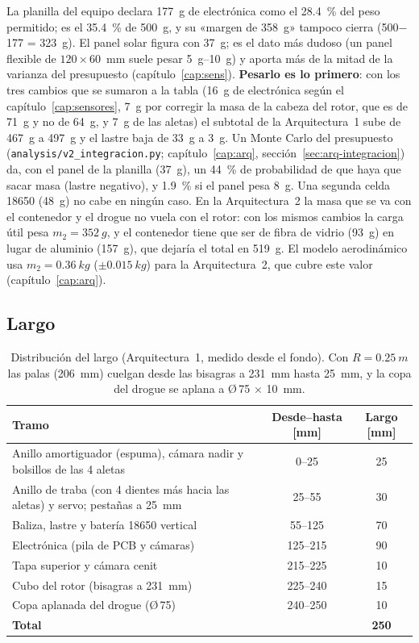 La planilla del equipo declara 177~g de electrónica como el \SI{28.4}{\percent} del peso
permitido; es el \SI{35.4}{\percent} de \SI{500}{g}, y su «margen de 358~g» tampoco cierra
(500$-$177 = 323~g). El panel solar figura con \SI{37}{g}; es el dato más dudoso (un panel
flexible de $120\times60$~mm suele pesar \SIrange{5}{10}{g}) y aporta más de la mitad de la
varianza del presupuesto (capítulo~\ref{cap:sens}). \textbf{Pesarlo es lo primero}: con los
tres cambios que se sumaron a la tabla (\SI{+16}{g} de electrónica según el capítulo~\ref{cap:sensores},
\SI{+7}{g} por corregir la masa de la cabeza del rotor, que es de \SI{71}{g} y no de \SI{64}{g}, y
\SI{+7}{g} de las aletas) el subtotal de la Arquitectura~1 sube de \SI{467}{g} a \SI{497}{g} y el lastre baja de
\SI{33}{g} a \SI{3}{g}. Un Monte Carlo del presupuesto (\texttt{analysis/v2\_integracion.py};
capítulo~\ref{cap:arq}, sección~\ref{sec:arq-integracion}) da, con el panel de la planilla (\SI{37}{g}), un
\SI{44}{\percent} de probabilidad de que haya que sacar masa (lastre negativo), y \SI{1.9}{\percent} si
el panel pesa \SI{8}{g}. Una segunda celda 18650 (\SI{48}{g}) no cabe en ningún caso. En la
Arquitectura~2 la masa que se va con el contenedor y el drogue no vuela con el rotor: con los mismos
cambios la carga útil pesa $m_2=\SI{352}{g}$, y el contenedor tiene que ser de fibra de vidrio
(\SI{93}{g}) en lugar de aluminio (\SI{157}{g}), que dejaría el total en \SI{519}{g}. El modelo aerodinámico usa
$m_2=\SI{0.36}{kg}$ ($\pm\SI{0.015}{kg}$) para la Arquitectura~2, que cubre este valor (capítulo~\ref{cap:arq}).

\subsection{Largo}
\begin{table}[H]
\centering\small
\caption{Distribución del largo (Arquitectura~1, medido desde el fondo). Con $R=\SI{0.25}{m}$ las
palas (\SI{206}{mm}) cuelgan desde las bisagras a \SI{231}{mm} hasta \SI{25}{mm}, y la copa
del drogue se aplana a Ø\,75 $\times$ \SI{10}{mm}.}\label{tab:largo}
\begin{tabularx}{\textwidth}{@{}Ycc@{}}
\toprule
\textbf{Tramo} & \textbf{Desde--hasta} [mm] & \textbf{Largo} [mm]\\\midrule
Anillo amortiguador (espuma), cámara nadir y bolsillos de las 4 aletas & 0--25 & 25\\
Anillo de traba (con 4 dientes más hacia las aletas) y servo; pestañas a \SI{25}{mm} & 25--55 & 30\\
Baliza, lastre y batería 18650 vertical & 55--125 & 70\\
Electrónica (pila de PCB y cámaras) & 125--215 & 90\\
Tapa superior y cámara cenit & 215--225 & 10\\
Cubo del rotor (bisagras a \SI{231}{mm}) & 225--240 & 15\\
Copa aplanada del drogue (Ø\,75) & 240--250 & 10\\\midrule
\textbf{Total} & & \textbf{250}\\
\bottomrule
\end{tabularx}
\end{table}

